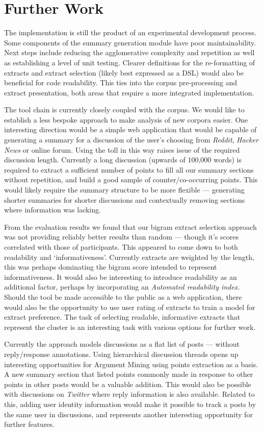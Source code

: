   \section{Further Work}
    The implementation is still the product of an experimental development process. Some components of the summary generation module have poor maintainability. Next steps include reducing the agglomerative complexity and repetition as well as establishing a level of unit testing. Clearer definitions for the re-formatting of extracts and extract selection (likely best expressed as a DSL) would also be beneficial for code readability. This ties into the corpus pre-processing and extract presentation, both areas that require a more integrated implementation.

    The tool chain is currently closely coupled with the corpus. We would like to establish a less bespoke approach to make analysis of new corpora easier. One interesting direction would be a simple web application that would be capable of generating a summary for a discussion of the user's choosing from \textit{Reddit}, \textit{Hacker News} or online forum. Using the toll in this way raises issue of the required discussion length. Currently a long discussion (upwards of 100,000 words) is required to extract a sufficient number of points to fill all our summary sections without repetition, and build a good sample of counter/co-occurring points. This would likely require the summary structure to be more flexible --- generating shorter summaries for shorter discussions and contextually removing sections where information was lacking.

    From the evaluation results we found that our bigram extract selection approach was not providing reliably better results than random --- though it's scores correlated with those of participants. This appeared to come down to both readability and `informativeness'. Currently extracts are weighted by the length, this was perhaps dominating the bigram score intended to represent informativeness. It would also be interesting to introduce readability as an additional factor, perhaps by incorporating an \textit{Automated readability index}. Should the tool be made accessible to the public as a web application, there would also be the opportunity to use user rating of extracts to train a model for extract preference. The task of selecting readable, informative extracts that represent the cluster is an interesting task with various options for further work.

    Currently the approach models discussions as a flat list of posts --- without reply/response annotations. Using hierarchical discussion threads opens up interesting opportunities for Argument Mining using points extraction as a basis. A new summary section that listed points commonly made in response to other points in other posts would be a valuable addition. This would also be possible with discussions on \textit{Twitter} where reply information is also available. Related to this, adding user identity information would make it possible to track a posts by the same user in discussions, and represents another interesting opportunity for further features.

